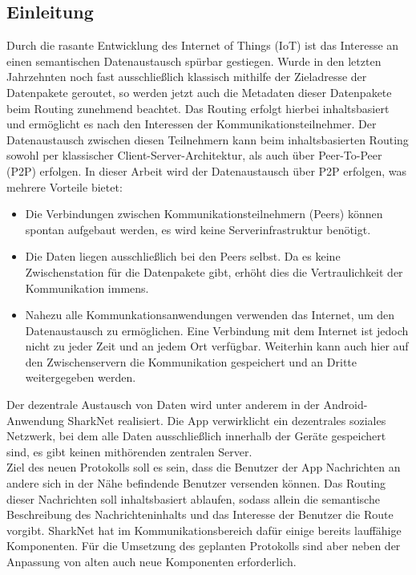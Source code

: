 


\subsection{Einleitung}
Durch die rasante Entwicklung des Internet of Things (IoT) ist das Interesse an einen semantischen Datenaustausch spürbar gestiegen. Wurde in den letzten Jahrzehnten noch fast ausschließlich klassisch mithilfe der Zieladresse der Datenpakete geroutet, so werden jetzt auch die Metadaten dieser Datenpakete beim Routing zunehmend beachtet. Das Routing erfolgt hierbei inhaltsbasiert und ermöglicht es nach den Interessen der Kommunikationsteilnehmer. Der Datenaustausch zwischen diesen Teilnehmern kann beim inhaltsbasierten Routing sowohl per klassischer Client-Server-Architektur, als auch über Peer-To-Peer (P2P) erfolgen. In dieser Arbeit wird der Datenaustausch über P2P erfolgen, was mehrere Vorteile bietet:
\begin{itemize}
\item Die Verbindungen zwischen Kommunikationsteilnehmern (Peers) können spontan aufgebaut werden, es wird keine Serverinfrastruktur benötigt.
\item Die Daten liegen ausschließlich bei den Peers selbst. Da es keine Zwischenstation für die Datenpakete gibt, erhöht dies die Vertraulichkeit der Kommunikation immens. 
\item Nahezu alle Kommunkationsanwendungen verwenden das Internet, um den Datenaustausch zu ermöglichen. Eine Verbindung mit dem Internet ist jedoch nicht zu jeder Zeit und an jedem Ort verfügbar. Weiterhin kann auch hier auf den Zwischenservern die Kommunikation gespeichert und an Dritte weitergegeben werden.
\end{itemize}  
Der dezentrale Austausch von Daten wird unter anderem in der Android-Anwendung SharkNet realisiert. Die App verwirklicht ein dezentrales soziales Netzwerk, bei dem alle Daten ausschließlich innerhalb der Geräte gespeichert sind, es gibt keinen mithörenden zentralen Server. \\Ziel des neuen Protokolls soll es sein, dass die Benutzer der App Nachrichten an andere sich in der Nähe befindende Benutzer versenden können. Das Routing dieser Nachrichten soll inhaltsbasiert ablaufen, sodass allein die semantische Beschreibung des Nachrichteninhalts und das Interesse der Benutzer die Route vorgibt. SharkNet hat im Kommunikationsbereich dafür einige bereits lauffähige Komponenten. Für die Umsetzung des geplanten Protokolls sind aber neben der Anpassung von alten auch neue Komponenten erforderlich. 
\newline [...]
\newpage
